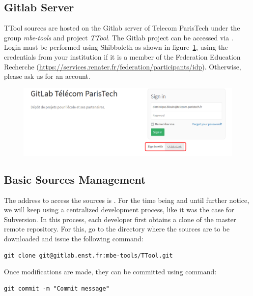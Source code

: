 \documentclass[12pt]{article}
\begin{document}
\subsection{Gitlab Server}

TTool sources are hosted on the Gitlab server of Telecom ParisTech under the
group \textit{mbe}\textit{-tools} and project \textit{TTool}. The Gitlab project
can be accessed via . Login must be performed using Shibboleth as shown in
figure~\ref{fig:image1}, using the credentials from your institution if it is a
member of the Federation Education Recherche (\url{https://services.renater.fr/federation/participants/idp}). Otherwise, please ask us for an account.

\begin{figure}[H]
\begin{center}
\includegraphics[width=\textwidth]{images/image1.png}
\end{center}
\caption{}
\label{fig:image1}
\end{figure}
 
\subsection{Basic Sources Management}

The address to access the sources is . For the time being and until further notice, we will keep using a centralized development process, like it was the case for Subversion. In this process, each developer first obtains a clone of the master remote repository. For this, go to the directory where the sources are to be downloaded and issue the following command: \\


\begin{verbatim}
git clone git@gitlab.enst.fr:mbe-tools/TTool.git
\end{verbatim}

Once modifications are made, they can be committed using command:

\begin{verbatim}
git commit -m "Commit message"
\end{verbatim}
\end{document}
